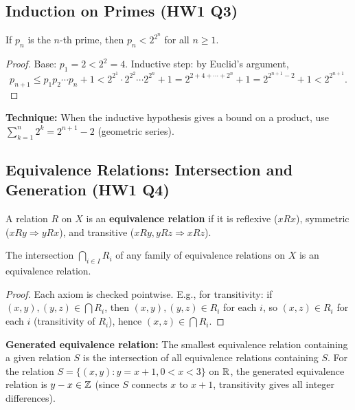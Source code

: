 \documentclass{article}
\begin{document}
\subsection{Induction on Primes (HW1 Q3)}
\begin{theorem}
  If $p_n$ is the $n$-th prime, then $p_n < 2^{2^n}$ for all $n \ge 1$.
\end{theorem}
\begin{proof}
  Base: $p_1 = 2 < 2^2 = 4$.
  Inductive step: by Euclid's argument,
  \[
    p_{n+1} \le p_1 p_2 \cdots p_n + 1
    < 2^{2^1} \cdot 2^{2^2} \cdots 2^{2^n} + 1
    = 2^{2+4+\cdots+2^n} + 1 = 2^{2^{n+1}-2} + 1 < 2^{2^{n+1}}.
  \]
\end{proof}
\textbf{Technique:} When the inductive hypothesis gives a bound on a
product, use $\sum_{k=1}^n 2^k = 2^{n+1} - 2$ (geometric series).

\subsection{Equivalence Relations: Intersection and Generation (HW1 Q4)}
\begin{definition}
  A relation $R$ on $X$ is an \textbf{equivalence relation} if it is
  reflexive ($x R x$), symmetric ($x R y \Rightarrow y R x$), and
  transitive ($x R y, y R z \Rightarrow x R z$).
\end{definition}

\begin{proposition}
  The intersection $\bigcap_{i \in I} R_i$ of any family of equivalence
  relations on $X$ is an equivalence relation.
\end{proposition}
\begin{proof}
  Each axiom is checked pointwise. E.g., for transitivity: if
  $(x,y), (y,z) \in \bigcap R_i$, then $(x,y), (y,z) \in R_i$ for
  each $i$, so $(x,z) \in R_i$ for each $i$ (transitivity of $R_i$),
  hence $(x,z) \in \bigcap R_i$.
\end{proof}

\textbf{Generated equivalence relation:} The smallest equivalence
relation containing a given relation $S$ is the intersection of all
equivalence relations containing $S$. For the relation $S = \{(x,y) :
y = x+1, 0 < x < 3\}$ on $\mathbb{R}$, the generated equivalence relation is
$y - x \in \mathbb{Z}$ (since $S$ connects $x$ to $x+1$, transitivity gives all
integer differences).
\end{document}
